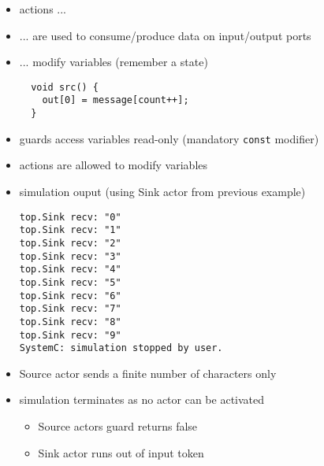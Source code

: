 \begin{frame}[fragile=singleslide]
\begin{itemize}
\item actions ...
\item ... are used to consume/produce data on input/output ports
\item ... modify variables (remember a state)
\begin{lstlisting}
  void src() {
    out[0] = message[count++];
  }
\end{lstlisting}
\item guards access variables read-only (mandatory \lstinline!const! modifier)
\item actions are allowed to modify variables
\end{itemize}
\end{frame}










\begin{frame}[fragile=singleslide]
\begin{itemize}
\item simulation ouput (using Sink actor from previous example)
\begin{lstlisting}
top.Sink recv: "0"
top.Sink recv: "1"
top.Sink recv: "2"
top.Sink recv: "3"
top.Sink recv: "4"
top.Sink recv: "5"
top.Sink recv: "6"
top.Sink recv: "7"
top.Sink recv: "8"
top.Sink recv: "9"
SystemC: simulation stopped by user.
\end{lstlisting}
\item Source actor sends a finite number of characters only
\item simulation terminates as no actor can be activated
  \begin{itemize}
  \item Source actors guard returns false
  \item Sink actor runs out of input token
  \end{itemize}
\end{itemize}
\end{frame}





